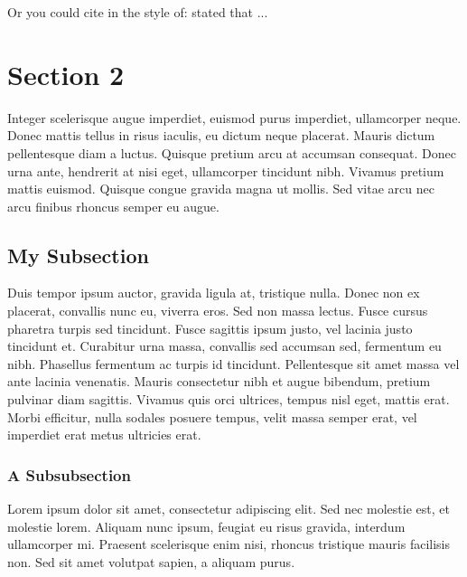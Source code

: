     Or you could cite \cite{lamport1994latex} in the style of: \citet{lamport1994latex} stated that ...

\section{Section 2}
\label{sec:section_2}
    Integer scelerisque augue imperdiet, euismod purus imperdiet, ullamcorper neque. Donec mattis tellus in risus iaculis, eu dictum neque placerat. Mauris dictum pellentesque diam a luctus. Quisque pretium arcu at accumsan consequat. Donec urna ante, hendrerit at nisi eget, ullamcorper tincidunt nibh. Vivamus pretium mattis euismod. Quisque congue gravida magna ut mollis. Sed vitae arcu nec arcu finibus rhoncus semper eu augue.

    \subsection{My Subsection}
    \label{sub:my_subsection}
        Duis tempor ipsum auctor, gravida ligula at, tristique nulla. Donec non ex placerat, convallis nunc eu, viverra eros. Sed non massa lectus. Fusce cursus pharetra turpis sed tincidunt. Fusce sagittis ipsum justo, vel lacinia justo tincidunt et. Curabitur urna massa, convallis sed accumsan sed, fermentum eu nibh. Phasellus fermentum ac turpis id tincidunt. Pellentesque sit amet massa vel ante lacinia venenatis. Mauris consectetur nibh et augue bibendum, pretium pulvinar diam sagittis. Vivamus quis orci ultrices, tempus nisl eget, mattis erat. Morbi efficitur, nulla sodales posuere tempus, velit massa semper erat, vel imperdiet erat metus ultricies erat.

        \subsubsection{A Subsubsection}
        \label{ssub:a_subsubsection}
            Lorem ipsum dolor sit amet, consectetur adipiscing elit. Sed nec molestie est, et molestie lorem. Aliquam nunc ipsum, feugiat eu risus gravida, interdum ullamcorper mi. Praesent scelerisque enim nisi, rhoncus tristique mauris facilisis non. Sed sit amet volutpat sapien, a aliquam purus.


